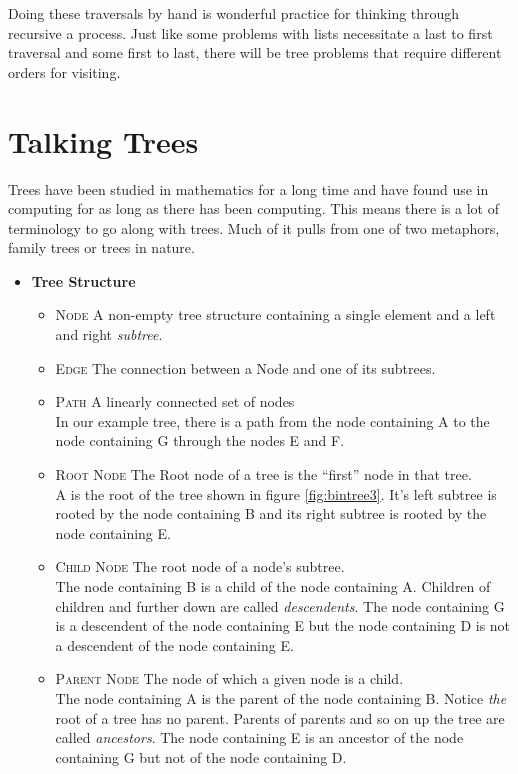 \documentclass[]{tufte-handout}
\begin{document}
Doing these traversals by hand is wonderful practice for thinking through recursive a process. Just like some problems with lists necessitate a last to first traversal and some first to last, there will be tree problems that require different orders for visiting. 

\section{Talking Trees} 

Trees have been studied in mathematics for a long time and have found use in computing for as long as there has been computing.  This means there is a lot of terminology to go along with trees. Much of it pulls from one of two metaphors, family trees or trees in nature.
\begin{itemize}
\item \textbf{Tree Structure}
\begin{itemize}
\item \textsc{Node} A non-empty tree structure containing a single element and a left and right \textit{subtree}. 
\item \textsc{Edge} The connection between a Node and one of its subtrees. 
\item \textsc{Path} A linearly connected set of nodes \\
In our example tree, there is a path from the node containing A to the node containing G through the nodes E and F.
\item \textsc{Root Node} The Root node of a tree is the ``first'' node in that tree. \\
 A is the root of the tree shown in figure \ref{fig:bintree3}. It's left subtree is rooted by the node containing B and its right subtree is rooted by the node containing E.
\item \textsc{Child Node} The root node of a node's subtree.  \\
The node containing B is a child of the node containing A. Children of children and further down are called \textit{descendents}.  The node containing G is a descendent of the node containing E but the node containing D is not a descendent of the node containing E. 
\item \textsc{Parent Node} The node of which a given node is a child. \\
The node containing A is the parent of the node containing B. Notice \textit{the} root of a tree has no parent. Parents of parents and so on up the tree are called \textit{ancestors}. The node containing E is an ancestor of the node containing G but not of the node containing D.

\end{itemize}
\end{itemize}
\end{document}
